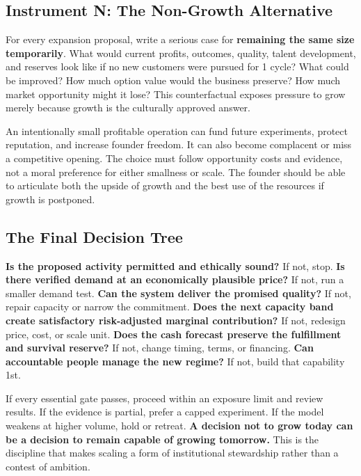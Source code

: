 \subsection{Instrument N: The Non-Growth Alternative}
\label{sec:instrument_n_non_growth_alternative}

For every expansion proposal, write a serious case for \textbf{remaining the same size temporarily}. What would current profits, outcomes, quality, talent development, and reserves look like if no new customers were pursued for 1 cycle? What could be improved? How much option value would the business preserve? How much market opportunity might it lose? This counterfactual exposes pressure to grow merely because growth is the culturally approved answer.

An intentionally small profitable operation can fund future experiments, protect reputation, and increase founder freedom. It can also become complacent or miss a competitive opening. The choice must follow opportunity costs and evidence, not a moral preference for either smallness or scale. The founder should be able to articulate both the upside of growth and the best use of the resources if growth is postponed.

\subsection{The Final Decision Tree}
\label{sec:final_decision_tree}

\textbf{Is the proposed activity permitted and ethically sound?} If not, stop. \textbf{Is there verified demand at an economically plausible price?} If not, run a smaller demand test. \textbf{Can the system deliver the promised quality?} If not, repair capacity or narrow the commitment. \textbf{Does the next capacity band create satisfactory risk-adjusted marginal contribution?} If not, redesign price, cost, or scale unit. \textbf{Does the cash forecast preserve the fulfillment and survival reserve?} If not, change timing, terms, or financing. \textbf{Can accountable people manage the new regime?} If not, build that capability 1st.

If every essential gate passes, proceed within an exposure limit and review results. If the evidence is partial, prefer a capped experiment. If the model weakens at higher volume, hold or retreat. \textbf{A decision not to grow today can be a decision to remain capable of growing tomorrow.} This is the discipline that makes scaling a form of institutional stewardship rather than a contest of ambition.
